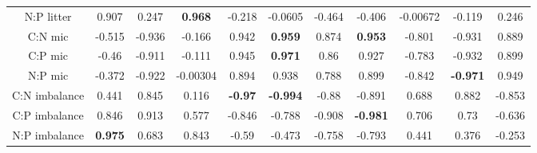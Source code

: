 \documentclass[authoryear,preprint,review,12pt]{elsarticle}
\begin{document}
\begin{table}[h!]
\begin{center}
{\begin{tabular}{ccccccccccc}
  N:P litter & 0.907 & 0.247 & \textbf{ 0.968 } & -0.218 & -0.0605 & -0.464 & -0.406 & -0.00672 & -0.119 & 0.246 \\ 
  C:N mic & -0.515 & -0.936 & -0.166 & 0.942 & \textbf{ 0.959 } & 0.874 & \textbf{ 0.953 } & -0.801 & -0.931 & 0.889 \\ 
  C:P mic & -0.46 & -0.911 & -0.111 & 0.945 & \textbf{ 0.971 } & 0.86 & 0.927 & -0.783 & -0.932 & 0.899 \\ 
  N:P mic & -0.372 & -0.922 & -0.00304 & 0.894 & 0.938 & 0.788 & 0.899 & -0.842 & \textbf{ -0.971 } & 0.949 \\ 
  C:N imbalance & 0.441 & 0.845 & 0.116 & \textbf{ -0.97 } & \textbf{ -0.994 } & -0.88 & -0.891 & 0.688 & 0.882 & -0.853 \\ 
  C:P imbalance & 0.846 & 0.913 & 0.577 & -0.846 & -0.788 & -0.908 & \textbf{ -0.981 } & 0.706 & 0.73 & -0.636 \\ 
  N:P imbalance & \textbf{ 0.975 } & 0.683 & 0.843 & -0.59 & -0.473 & -0.758 & -0.793 & 0.441 & 0.376 & -0.253 \\ 
   \hline
\end{tabular}
}
\end{center}
\end{table}
\newpage
\end{document}
